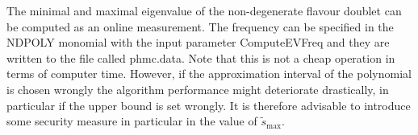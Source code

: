 The minimal and maximal eigenvalue of the non-degenerate flavour
doublet can be computed as an online measurement. The frequency can be
specified in the {\ttfamily NDPOLY} monomial with the input parameter
{\ttfamily ComputeEVFreq} and they are written to the file called
{\ttfamily phmc.data}. Note that this is not a cheap operation in
terms of computer time. However, if the approximation interval of the
polynomial is chosen wrongly the algorithm performance might
deteriorate drastically, in particular if the upper bound is set
wrongly. It is therefore advisable to introduce some security measure
in particular in the value of $\tilde s_\mathrm{max}$. 

